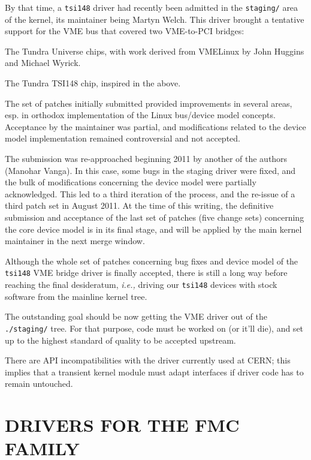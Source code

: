 \documentclass{JAC2003}
\begin{document}
By that time, a \verb|tsi148| driver had recently been admitted in
the \texttt{staging/} area of the kernel, its maintainer being Martyn
Welch. This driver brought a tentative support for the VME bus that covered
two VME-to-PCI bridges:
\begin{Itemize}
\item The Tundra Universe chips, with work derived from VMELinux by John
Huggins and Michael Wyrick.
\item The Tundra TSI148 chip, inspired in the above.
\end{Itemize}

The set of patches initially submitted provided improvements in several areas,
esp. in orthodox implementation of the Linux bus/device model concepts.
Acceptance by the maintainer was partial, and modifications related to the
device model implementation remained controversial and not accepted.

The submission was re-approached beginning 2011 by another of the authors
(Manohar Vanga). In this case, some bugs in the staging driver were fixed,
and the bulk of modifications concerning the device model were partially
acknowledged. This led to a third iteration of the process, and the
re-issue of a third patch set in August 2011. At the time of this writing,
the definitive submission and acceptance of the last set of patches (five
change sets) concerning the core device model is in its final stage, and will
be applied by the main kernel maintainer in the next merge window.

Although the whole set of patches concerning bug fixes and device model of the
\verb|tsi148| VME bridge driver is finally accepted, there is still a long
way before reaching the final desideratum, \emph{i.e.,} driving our
\verb|tsi148| devices with stock software from the mainline kernel tree.
\begin{Itemize}
\item The outstanding goal should be now getting the VME driver out of the
\verb|./staging/| tree. For that purpose, code must be worked on (or it'll
die), and set up to the highest standard of quality to be accepted upstream.
\item There are API  incompatibilities with the driver currently used at
CERN; this implies that a transient kernel module must adapt interfaces
if driver code has to remain untouched.
\end{Itemize}

\section{DRIVERS FOR THE FMC FAMILY}
\end{document}
